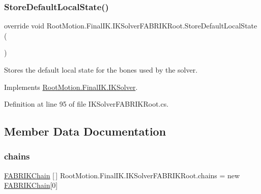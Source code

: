 \subsubsection{\texorpdfstring{Store\+Default\+Local\+State()}{StoreDefaultLocalState()}}
{\footnotesize\ttfamily override void Root\+Motion.\+Final\+I\+K.\+I\+K\+Solver\+F\+A\+B\+R\+I\+K\+Root.\+Store\+Default\+Local\+State (\begin{DoxyParamCaption}{ }\end{DoxyParamCaption})\hspace{0.3cm}{\ttfamily [virtual]}}



Stores the default local state for the bones used by the solver. 



Implements \mbox{\hyperlink{class_root_motion_1_1_final_i_k_1_1_i_k_solver_a5009a12837b12c96fed91bc6dc0bd4b6}{Root\+Motion.\+Final\+I\+K.\+I\+K\+Solver}}.



Definition at line 95 of file I\+K\+Solver\+F\+A\+B\+R\+I\+K\+Root.\+cs.



\subsection{Member Data Documentation}
\mbox{\label{class_root_motion_1_1_final_i_k_1_1_i_k_solver_f_a_b_r_i_k_root_ad3e855d0443097a275c9d6cd765429bc}} 
\subsubsection{\texorpdfstring{chains}{chains}}
{\footnotesize\ttfamily \mbox{\hyperlink{class_root_motion_1_1_final_i_k_1_1_f_a_b_r_i_k_chain}{F\+A\+B\+R\+I\+K\+Chain}} \mbox{[}$\,$\mbox{]} Root\+Motion.\+Final\+I\+K.\+I\+K\+Solver\+F\+A\+B\+R\+I\+K\+Root.\+chains = new \mbox{\hyperlink{class_root_motion_1_1_final_i_k_1_1_f_a_b_r_i_k_chain}{F\+A\+B\+R\+I\+K\+Chain}}\mbox{[}0\mbox{]}}



